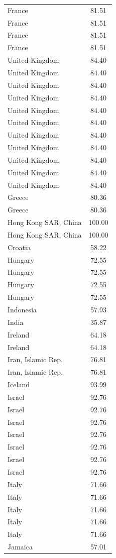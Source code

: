\documentclass[
]{article}
\begin{document}
\begin{center}
\begin{ThreePartTable}
\begin{longtable}{lc}
France & 81.51\\
France & 81.51\\
France & 81.51\\
France & 81.51\\
United Kingdom & 84.40\\
United Kingdom & 84.40\\
United Kingdom & 84.40\\
United Kingdom & 84.40\\
United Kingdom & 84.40\\
United Kingdom & 84.40\\
United Kingdom & 84.40\\
United Kingdom & 84.40\\
United Kingdom & 84.40\\
United Kingdom & 84.40\\
United Kingdom & 84.40\\
Greece & 80.36\\
Greece & 80.36\\
Hong Kong SAR, China & 100.00\\
Hong Kong SAR, China & 100.00\\
Croatia & 58.22\\
Hungary & 72.55\\
Hungary & 72.55\\
Hungary & 72.55\\
Hungary & 72.55\\
Indonesia & 57.93\\
India & 35.87\\
Ireland & 64.18\\
Ireland & 64.18\\
Iran, Islamic Rep. & 76.81\\
Iran, Islamic Rep. & 76.81\\
Iceland & 93.99\\
Israel & 92.76\\
Israel & 92.76\\
Israel & 92.76\\
Israel & 92.76\\
Israel & 92.76\\
Israel & 92.76\\
Israel & 92.76\\
Italy & 71.66\\
Italy & 71.66\\
Italy & 71.66\\
Italy & 71.66\\
Italy & 71.66\\
Jamaica & 57.01\\

\end{longtable}
\end{ThreePartTable}
\end{center}
\end{document}
